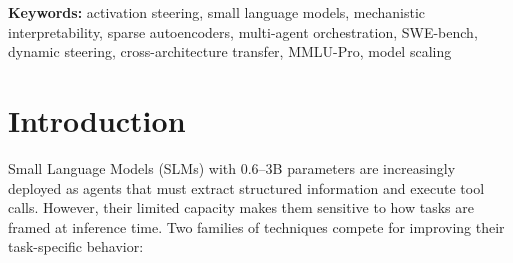 \documentclass[11pt,a4paper]{article}
\begin{document}
\begin{abstract}
Our key findings are: (a)~\textbf{mid-layer steering (layers 15--18) achieves 100\% behavioral change} at moderate coefficients ($\alpha=30$), while late layers (33--35) are rigid---an \textit{architectural} property independent of instruction tuning; (b)~\textbf{base models are more steerable but fragile}---effective at $\alpha=30$ but degenerate at $\alpha\geq60$; (c)~\textbf{steering on a 0.6B SLM boosts GSM8K accuracy by +16pp} under zero-shot CoT (46\%$\to$62\%), but \textbf{degrades under 5-shot} ($-$8pp), revealing destructive interference between steering and few-shot prompting; (d)~\textbf{KL divergence confirms a 3-order-of-magnitude gap} between mid-layer (1--48 bits) and late-layer ($<$0.01 bits) steering; (e)~a \textbf{dynamic steering orchestrator} that switches domain-specific vectors per plan step achieves 4--7$\times$ more domain-relevant outputs than baseline; (f)~on SWE-bench Verified, RAG-augmented steering produces patches with \textbf{68\% valid file paths} (vs.\ 0\% without RAG), with 95\% of instances generating syntactically valid diffs; (g)~\textbf{domain steering geometry is architecture-invariant} (Spearman $\rho > 0.88$ across Transformer, larger Transformer, and hybrid SSM+Attention models), with history as a universal outlier---though direct vector transfer remains impossible due to differing hidden dimensions. We present a validated architecture for training-free enhancement of SLM agents via sequential steering with adaptive coefficients.
\end{abstract}

\textbf{Keywords:} activation steering, small language models, mechanistic interpretability, sparse autoencoders, multi-agent orchestration, SWE-bench, dynamic steering, cross-architecture transfer, MMLU-Pro, model scaling

\section{Introduction}
\label{sec:intro}

Small Language Models (SLMs) with 0.6--3B parameters are increasingly deployed as agents that must extract structured information and execute tool calls. However, their limited capacity makes them sensitive to how tasks are framed at inference time. Two families of techniques compete for improving their task-specific behavior:

\end{document}
